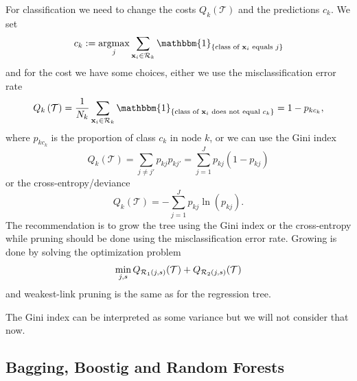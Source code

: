 \documentclass[a4paper, 12pt]{scrartcl}
\begin{document}
\begin{algorithm}
	For classification we need to change the costs $Q_k\left(\mathcal{T}\right)$ and the predictions $c_k$.
	We set
	\begin{equation*}
		c_k:=\operatornamewithlimits{argmax}_j \sum_{\mathbf{x}_i\in \mathcal{R}_k}\mathbbm{1}_{\{\text{class of }\mathbf{x}_i\text{ equals }j \}}
	\end{equation*}
	and for the cost we have some choices, either we use the misclassification error rate
	\begin{equation*}
		Q_k\left(\mathcal{T}\right)=\frac{1}{N_k}\sum_{\mathbf{x}_i\in \mathcal{R}_k}\mathbbm{1}_{\{\text{class of }\mathbf{x}_i\text{ does not equal }c_k \}}=1-p_{kc_k},
	\end{equation*}
	where $p_{kc_k}$ is the proportion of class $c_k$ in node $k$, or we can use the Gini index
	\begin{equation*}
		Q_k\left(\mathcal{T}\right)=\sum_{j\neq j'}p_{kj}p_{kj'}=\sum_{j=1}^{J}p_{kj}\left(1-p_{kj}\right)
	\end{equation*}
	or the cross-entropy/deviance
	\begin{equation*}
		Q_k\left(\mathcal{T}\right)=-\sum_{j=1}^{J}p_{kj}\ln\left(p_{kj}\right).
	\end{equation*}
	The recommendation is to grow the tree using the Gini index or the cross-entropy while pruning should be done using the misclassification error rate.
	Growing is done by solving the optimization problem
	\begin{equation*}
	\operatornamewithlimits{min}_{j,s} Q_{\mathcal{R}_1\left(j,s\right)}(\mathcal{T}) + Q_{\mathcal{R}_2\left(j,s\right)}(\mathcal{T})
	\end{equation*}
	and weakest-link pruning is the same as for the regression tree.
\end{algorithm}
The Gini index can be interpreted as some variance but we will not consider that now.

\subsection{Bagging, Boostig and Random Forests}
\end{document}
